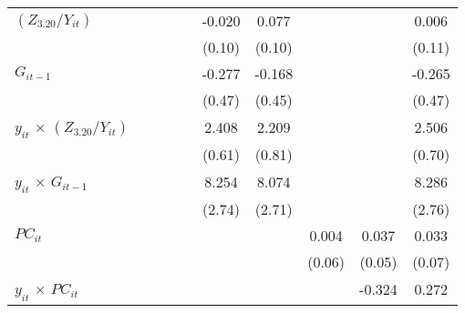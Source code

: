 \documentclass[12pt, a4paper]{article}
\begin{document}
\begin{table}[htbp]
\begin{threeparttable}
{\begin{tabular}{l*{9}{c}}
				$(Z_{3.20}/Y_{it})$          &                     &                     &                     &                     &      -0.020         &       0.077         &                     &                     &       0.006         \\
				&                     &                     &                     &                     &      (0.10)         &      (0.10)         &                     &                     &      (0.11)         \\
				$G_{it-1}$            &                     &                     &                     &                     &      -0.277         &      -0.168         &                     &                     &      -0.265         \\
				&                     &                     &                     &                     &      (0.47)         &      (0.45)         &                     &                     &      (0.47)         \\
				$y_{it}$ $\times$ $(Z_{3.20}/Y_{it})$&                     &                     &                     &                     &       2.408\sym{***}&       2.209\sym{**} &                     &                     &       2.506\sym{***}\\
				&                     &                     &                     &                     &      (0.61)         &      (0.81)         &                     &                     &      (0.70)         \\
				$y_{it}$ $\times$ $G_{it-1}$&                     &                     &                     &                     &       8.254\sym{**} &       8.074\sym{**} &                     &                     &       8.286\sym{**} \\
				&                     &                     &                     &                     &      (2.74)         &      (2.71)         &                     &                     &      (2.76)         \\
				$PC_{it}$                &                     &                     &                     &                     &                     &                     &       0.004         &       0.037         &       0.033         \\
				&                     &                     &                     &                     &                     &                     &      (0.06)         &      (0.05)         &      (0.07)         \\
				$y_{it}$ $\times$ $PC_{it}$ &                     &                     &                     &                     &                     &                     &                     &      -0.324         &       0.272         \\

\end{tabular}}
\end{threeparttable}
\end{table}
\end{document}
